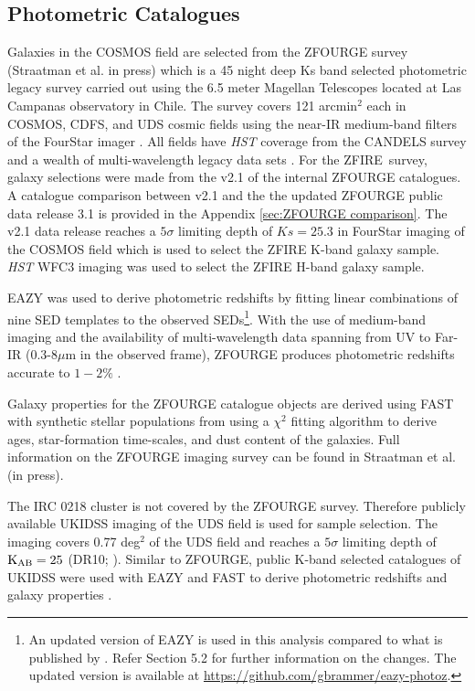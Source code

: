 \documentclass[iop]{emulateapj}
\begin{document}
\subsection{Photometric Catalogues}

Galaxies in the COSMOS field are selected from the ZFOURGE  survey (Straatman et al. in press) which is 
a 45 night deep Ks band selected photometric legacy survey carried out using the 6.5 meter Magellan Telescopes located at Las Campanas observatory in Chile. 
The survey covers 121 arcmin$\mathrm{^2}$ each in COSMOS, CDFS, and UDS cosmic fields using the near-IR medium-band filters of the FourStar imager \citep{Persson2013}.  
All fields have \emph{HST} coverage from the CANDELS survey \citep{Grogin2011,Koekemoer2011} and a wealth of multi-wavelength legacy data sets \citep{Giacconi2002,Capak2007,Lawrence2007}. 
For the ZFIRE\ survey, galaxy selections were made from the v2.1 of the internal ZFOURGE catalogues. A catalogue comparison between v2.1 and the the updated ZFOURGE public data release 3.1 is provided in the Appendix \ref{sec:ZFOURGE comparison}. 
The v2.1 data release reaches a $5\sigma$ limiting depth of $Ks=25.3$ in FourStar imaging of the COSMOS field \citep{Spitler2012} which is used to select the ZFIRE K-band galaxy sample. 
\emph{HST} WFC3 imaging was used to select the ZFIRE H-band galaxy sample. 


EAZY \citep{Brammer2008} was used to derive photometric redshifts by fitting linear combinations of nine SED templates to the observed SEDs\footnote{An updated version of EAZY is used in this analysis compared to what is published by \citet{Brammer2008}. Refer \citet{Skelton2014} Section 5.2 for further information on the changes. The updated version is available at \url{https://github.com/gbrammer/eazy-photoz}.}. 
With the use of medium-band imaging and the availability of multi-wavelength data spanning from UV to Far-IR (0.3-8$\mu$m in the observed frame), ZFOURGE produces photometric redshifts accurate to $1-2\%$ \cite[Straatman et al., in press;][]{Kawinwanichakij2014,Tomczak2014}. 


Galaxy properties for the ZFOURGE catalogue objects are derived using FAST \citep{Kriek2009} with synthetic stellar populations from \citet{Bruzual2003}  using a $\chi^2$ fitting algorithm to derive ages, star-formation time-scales, and dust content of the galaxies. 
Full information on the ZFOURGE imaging survey can be found in  Straatman et al. (in press).


The IRC 0218 cluster is not covered by the ZFOURGE survey. Therefore  publicly available UKIDSS imaging \citep{Lawrence2007} of the UDS field is used for sample selection.
The imaging covers 0.77 deg$^2$ of the UDS field and reaches a $5\sigma$ limiting depth of $\rm K_{AB}= 25$  (DR10;  \cite{UDS_DR10}). 
Similar to ZFOURGE, public K-band selected catalogues of UKIDSS were used with EAZY and FAST to derive photometric redshifts and galaxy properties \citep{Quadri2012}. 
\end{document}
